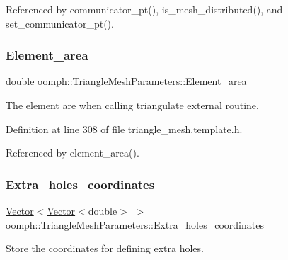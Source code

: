 Referenced by communicator\+\_\+pt(), is\+\_\+mesh\+\_\+distributed(), and set\+\_\+communicator\+\_\+pt().

\mbox{\label{classoomph_1_1TriangleMeshParameters_afb48563db8d81652f699b3bc5964c8e3}} 
\subsubsection{\texorpdfstring{Element\+\_\+area}{Element\_area}}
{\footnotesize\ttfamily double oomph\+::\+Triangle\+Mesh\+Parameters\+::\+Element\+\_\+area\hspace{0.3cm}{\ttfamily [protected]}}



The element are when calling triangulate external routine. 



Definition at line 308 of file triangle\+\_\+mesh.\+template.\+h.



Referenced by element\+\_\+area().

\mbox{\label{classoomph_1_1TriangleMeshParameters_aa503725c7d6941b3b55d00498576ea5a}} 
\subsubsection{\texorpdfstring{Extra\+\_\+holes\+\_\+coordinates}{Extra\_holes\_coordinates}}
{\footnotesize\ttfamily \hyperlink{classoomph_1_1Vector}{Vector}$<$\hyperlink{classoomph_1_1Vector}{Vector}$<$double$>$ $>$ oomph\+::\+Triangle\+Mesh\+Parameters\+::\+Extra\+\_\+holes\+\_\+coordinates\hspace{0.3cm}{\ttfamily [protected]}}



Store the coordinates for defining extra holes. 




